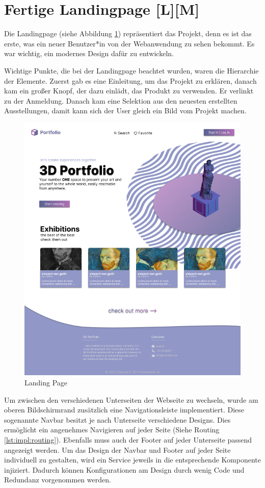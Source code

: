 \section{Fertige Landingpage [L][M]}
Die Landingpage (siehe Abbildung \ref{fig:impl:finishedLandingpage}) repräsentiert das Projekt, denn es ist das erste, was ein neuer Benutzer*in von der Webanwendung zu sehen bekommt. Es war wichtig, ein modernes Design dafür zu entwickeln.

Wichtige Punkte, die bei der Landingpage beachtet wurden, waren die Hierarchie der Elemente. Zuerst gab es eine Einleitung, um das Projekt zu erklären, danach kam ein großer Knopf, der dazu einlädt, das Produkt zu verwenden. Er verlinkt zu der Anmeldung. Danach kam eine Selektion aus den neuesten erstellten Ausstellungen, damit kann sich der User gleich ein Bild vom Projekt machen.

\begin{figure}
    \centering
    \includegraphics[scale=.5]{pics/startingpage.png}
    \caption{Landing Page}
    \label{fig:impl:finishedLandingpage}
\end{figure}

Um zwischen den verschiedenen Unterseiten der Webseite zu wechseln, wurde am oberen Bildschirmrand zusätzlich eine Navigationsleiste implementiert. Diese sogenannte Navbar besitzt je nach Unterseite verschiedene Designs. Dies ermöglicht ein angenehmes Navigieren auf jeder Seite (Siehe Routing \ref{lst:impl:routing}). Ebenfalls muss auch der Footer auf jeder Unterseite passend angezeigt werden. Um das Design der Navbar und Footer auf jeder Seite individuell zu gestalten, wird ein Service jeweils in die entsprechende Komponente injiziert. Dadurch können Konfigurationen am Design durch wenig Code und Redundanz vorgenommen werden. 


